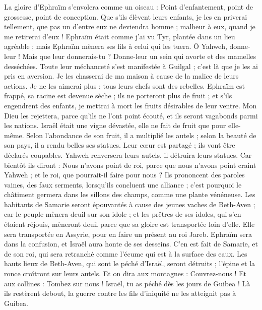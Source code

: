 \begin{multicols}{2}
La gloire d'Ephraïm s'envolera comme un oiseau : Point d'enfantement, point de grossesse, point de conception.
Que s'ils élèvent leurs enfants, je les en priverai tellement, que pas un d'entre eux ne deviendra homme ; malheur à eux, quand je me retirerai d'eux !
Ephraïm était comme j'ai vu Tyr, plantée dans un lieu agréable ; mais Ephraïm mènera ses fils à celui qui les tuera.
Ô Yahweh, donne-leur ! Mais que leur donnerais-tu ? Donne-leur un sein qui avorte et des mamelles desséchées.
Toute leur méchanceté s'est manifestée à Guilgal ; c'est là que je les ai pris en aversion. Je les chasserai de ma maison à cause de la malice de leurs actions. Je ne les aimerai plus ; tous leurs chefs sont des rebelles.
Ephraïm est frappé, sa racine est devenue sèche ; ils ne porteront plus de fruit ; et s'ils engendrent des enfants, je mettrai à mort les fruits désirables de leur ventre.
Mon Dieu les rejettera, parce qu'ils ne l'ont point écouté, et ils seront vagabonds parmi les nations.
\VerseOne{}Israël était une vigne dévastée, elle ne fait de fruit que pour elle-même. Selon l'abondance de son fruit, il a multiplié les autels ; selon la beauté de son pays, il a rendu belles ses statues.
Leur cœur est partagé ; ils vont être déclarés coupables. Yahweh renversera leurs autels, il détruira leurs statues.
Car bientôt ils diront : Nous n'avons point de roi, parce que nous n'avons point craint Yahweh ; et le roi, que pourrait-il faire pour nous ?
Ils prononcent des paroles vaines, des faux serments, lorsqu'ils concluent une alliance ; c'est pourquoi le châtiment germera dans les sillons des champs, comme une plante vénéneuse.
Les habitants de Samarie seront épouvantés à cause des jeunes vaches de Beth-Aven ; car le peuple mènera deuil sur son idole ; et les prêtres de ses idoles, qui s'en étaient réjouis, mèneront deuil parce que sa gloire est transportée loin d'elle.
Elle sera transportée en Assyrie, pour en faire un présent au roi Jareb. Ephraïm sera dans la confusion, et Israël aura honte de ses desseins.
C'en est fait de Samarie, et de son roi, qui sera retranché comme l'écume qui est à la surface des eaux.
Les hauts lieux de Beth-Aven, qui sont le péché d'Israël, seront détruits ; l'épine et la ronce croîtront sur leurs autels. Et on dira aux montagnes : Couvrez-nous ! Et aux collines : Tombez sur nous !
Israël, tu as péché dès les jours de Guibea ! Là ils restèrent debout, la guerre contre les fils d'iniquité ne les atteignit pas à Guibea.

\end{multicols}
